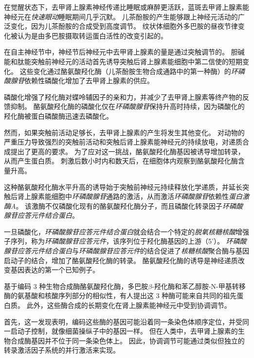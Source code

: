\begin{proposition}[儿茶酚胺的产生随神经元活动而变化] \label{box:16_1}
	
	\quad \quad 在觉醒状态下，去甲肾上腺素神经传递比睡眠或麻醉更活跃，蓝斑去甲肾上腺素能神经元在\textit{快速眼动}睡眠期间几乎沉默。
	儿茶酚胺的产生能够跟上神经元活动的广泛变化，因为儿茶酚胺的合成受到高度调节。
	纹状体细胞外多巴胺的昼夜节律变化被认为是由多巴胺摄取转运蛋白活性的改变引起的。
	
	\quad \quad 在自主神经节中，神经节后神经元中去甲肾上腺素的量是通过突触调节的。
	胆碱能和肽能突触前神经元的活动首先诱导突触后肾上腺素能细胞中第二信使的短期变化。
	这些变化通过酪氨酸羟化酶（儿茶酚胺生物合成通路中的第一种酶）的\textit{环磷酸腺苷}依赖性磷酸化增加了去甲肾上腺素的供应。
	
	\quad \quad 磷酸化增强了羟化酶对蝶呤辅因子的亲和力，并减少了去甲肾上腺素等终产物的反馈抑制。
	酪氨酸羟化酶的磷酸化仅在\textit{环磷酸腺苷}保持升高时持续，因为磷酸化的羟化酶被蛋白磷酸酶迅速去磷酸化。
	
	\quad \quad 然而，如果突触前活动足够长，去甲肾上腺素的产生将发生其他变化。
	对动物的严重压力导致强烈的突触前活动和突触后肾上腺素能神经元的持续放电，对递质合成提出了更高的要求。
	为了应对这一挑战，酪氨酸羟化酶基因被诱导增加转录，从而产生蛋白质。
	刺激后数小时内和数天后，在细胞体内观察到酪氨酸羟化酶含量升高。
	
	\quad \quad 这种酪氨酸羟化酶水平升高的诱导始于突触前神经元持续释放化学递质，并延长突触后肾上腺素能细胞中\textit{环磷酸腺苷}通路的激活，从而激活\textit{环磷酸腺苷}依赖性\textit{蛋白激酶A}。
	该激酶不仅磷酸化现有的酪氨酸羟化酶分子，而且磷酸化转录因子\textit{环磷酸腺苷应答元件结合蛋白}。
	
	\quad \quad 一旦磷酸化，\textit{环磷酸腺苷应答元件结合蛋白}就会结合一个特定的\textit{脱氧核糖核酸}增强子序列，称为\textit{环磷酸腺苷应答元件}，该序列位于羟化酶基因的上游（5'）。
	\textit{环磷酸腺苷应答元件结合蛋白}与\textit{环磷酸腺苷应答元件}的结合促进了\textit{核糖核酸}聚合酶与基因启动子的结合，增加了酪氨酸羟化酶的转录。
	酪氨酸羟化酶的诱导是神经递质改变基因表达的第一个已知例子。
	
	\quad \quad 基于编码 3 种生物合成酶酪氨酸羟化酶，多巴胺$\beta$-羟化酶和苯乙醇胺-N-甲基转移酶的氨基酸和核酸序列部分的相似性，有人提出这 3 种酶可能来自共同的祖先蛋白质。
	此外，这些酶合成的长期变化在肾上腺素能神经元中受到协调调节。
	
	\quad \quad 首先，这一发现表明，编码这些酶的基因可能沿着同一条染色体顺序定位，并受同一启动子控制，就像细菌操纵子中的基因一样。
	但在人类中，去甲肾上腺素的生物合成酶基因并不位于同一条染色体上。
	因此，协调调节可能通过类似但独立的转录激活因子系统的并行激活来实现。
	
\end{proposition}



